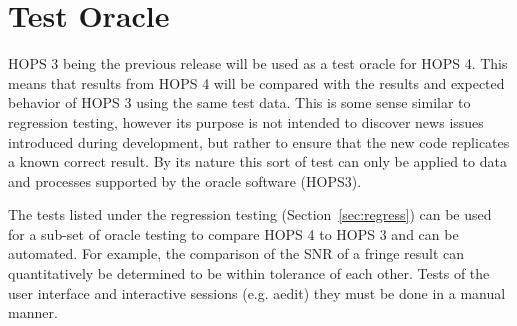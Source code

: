 %
%
\section{Test Oracle}
\label{sec:oracle}
HOPS 3 being the previous release will be used as a test oracle for HOPS 4. This means that
results from HOPS 4 will be compared with the results and expected behavior of HOPS 3 using
the same test data. This is some sense similar to regression testing, however its purpose
is not intended to discover news issues introduced during development, but rather to ensure
that the new code replicates a known correct result. By its nature this sort of test can only be applied
to data and processes supported by the oracle software (HOPS3).

The tests listed under the regression testing (Section~\ref{sec:regress}) can be used for a sub-set of
oracle testing to compare HOPS 4 to HOPS 3 and can be automated. For example, the comparison of the SNR
of a fringe result can quantitatively be determined to be within tolerance of each other. Tests of the user interface and interactive 
sessions (e.g. aedit) they must be done in a manual manner.


%
%
